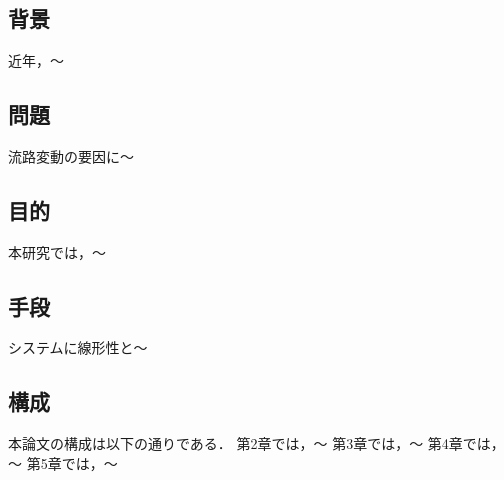 \chapter{}

\section{背景}
近年，～

\section{問題}
流路変動の要因に～

\section{目的}
本研究では，～

\section{手段}
システムに線形性と～

\section{構成}
本論文の構成は以下の通りである．
第2章では，～
第3章では，～
第4章では，～
第5章では，～







